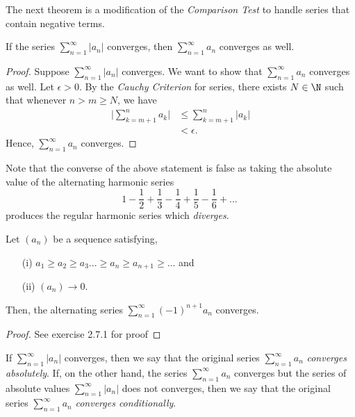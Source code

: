 The next theorem is a modification of the \textit{Comparison Test} to handle series that contain negative terms.

\begin{tcolorbox}
    \begin{thm}
    If the series \( \sum_{n=1}^{\infty} |a_n| \) converges, then \( \sum_{n=1}^{\infty} a_n\) converges as well.
\end{thm}
\end{tcolorbox}

\begin{proof}
    Suppose \( \sum_{n=1}^{\infty}|a_n|\) converges. We want to show that \( \sum_{n=1}^{\infty} a_n\) converges as well. Let \(\epsilon > 0 \). By the \textit{Cauchy Criterion} for series, there exists \( N \in \N \) such that whenever \( n > m \geq N \), we have 
\begin{align*}
    \Big|\sum_{k=m+1}^{n} a_k \Big|&\leq \sum_{k=m+1}^{n} |a_k| \\
                     &< \epsilon.
\end{align*}
Hence, \( \sum_{n=1}^{\infty} a_n \) converges.
\end{proof}

Note that the converse of the above statement is false as taking the absolute value of the alternating harmonic series 
\[ 1 - \frac{1}{2} + \frac{1}{3} - \frac{1}{4} + \frac{1}{5} - \frac{1}{6} + ... ~  \]
produces the regular harmonic series which \textit{diverges}.

\begin{tcolorbox}
    \begin{thm}
    Let \((a_n)\) be a sequence satisfying, 
    \begin{enumerate}
        \item[(i)] \( a_1 \geq a_2 \geq a_3 ... \geq a_n \geq a_{n+1} \geq ... \) and
        \item[(ii)] \((a_n) \to 0\).
    \end{enumerate}
    Then, the alternating series \( \sum_{n=1}^{\infty} (-1)^{n+1} a_n\) converges.
\end{thm}
\end{tcolorbox}
\begin{proof}
See exercise 2.7.1 for proof
\end{proof}

\begin{tcolorbox}
\begin{defn}
If \( \sum_{n=1}^{\infty} |a_n| \) converges, then we say that the original series \( \sum_{n=1}^{\infty} a_n \) \textit{converges absolutely}. If, on the other hand, the series \( \sum_{n=1}^{\infty} a_n \) converges but the series of absolute values \( \sum_{n=1}^{\infty} |a_n|\) does not converges, then we say that the original series \(\sum_{n=1}^{\infty} a_n \) \textit{converges conditionally}.
\end{defn}
\end{tcolorbox}

